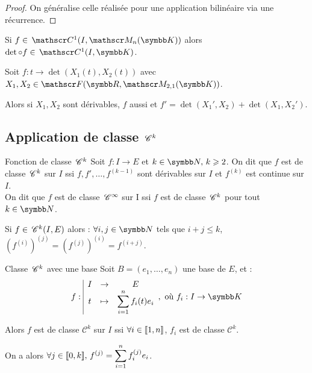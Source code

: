 \begin{proof}
    On généralise celle réalisée pour une application bilinéaire via une récurrence.
\end{proof}

\begin{corollaire}{}{}
    Si $f \in \mc 1(I, \mathscr M_n(\K))$ alors $\det \circ f \in \mc 1(I, \K)$.
\end{corollaire}

\begin{exemple}
    Soit $f: t \to \det(X_1(t), X_2(t))$ avec $X_1, X_2 \in \mathscr F(\R, \mathscr M_{2, 1}(\K))$. 

    Alors si $X_1, X_2$ sont dérivables, $f$ aussi et 
    $f' = \det(X_1', X_2) + \det(X_1, X_2')$.
\end{exemple}

\subsection{Application de classe \texorpdfstring{$\,\mathscr C^{k}$}{Ck}}

\begin{definition}{Fonction de classe $\,\mathscr C^{k}$}{}
    Soit $f : I \to E$ et $k \in \N, \, k \geqslant 2$. On dit que $f$ est de classe 
    $\,\mathscr C^{k}$ sur $I$ ssi $f, f', \ldots, f^{(k-1)}$ sont dérivables sur $I$ et $f^{(k)}$ est continue sur $I$. \\

    On dit que $f$ est de classe $\,\mathscr C^{\infty}$ sur I ssi $f$ est de classe 
    $\,\mathscr C^{k}$ pour tout $k \in \N$.
\end{definition}

\begin{remarque}
    Si $f \in \,\mathscr C^{k}(I,E)$ alors :
    $\ds \forall i,j \in \N$ tels que $i + j \leqslant k$,
    $\left(f^{(i)}\right)^{(j)} = \left(f^{(j)}\right)^{(i)} = f^{(i+j)}$.
\end{remarque}

\begin{proposition}{Classe $\,\mathscr C^{k}$ avec une base}{}
    Soit $B = (e_1, \ldots, e_n)$ une base de $E$, et :
    \[\fonction{f}{I}{E}{t}{\sum_{i=1}^n f_i(t)e_i},~\text{où}~f_i : I \to \K\]


    Alors $f$ est de classe $\mathscr C^k$ sur $I$ ssi $\forall i \in [\![1, n]\!]$, $f_i$ est de classe $\mathscr C^k$. 

    On a alors $\displaystyle \forall j \in [\![0, k]\!], \, f^{(j)} = \sum_{i=1}^n f_i^{(j)}e_i$.
\end{proposition}

